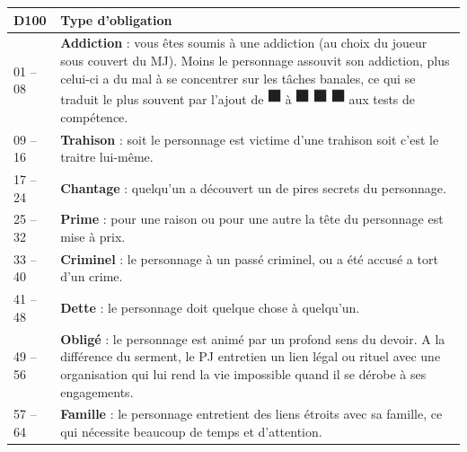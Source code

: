 \documentclass[twoside]{article}
\begin{document}
\renewcommand{\arraystretch}{1.4}
\begin{center}
	\begin{tabular}{|p{4.5cm}|p{12cm}|}
		\hline 
		\cellcolor{DarkRed} {\large \textcolor{PureWhite}{\textbf{D100}}} & \cellcolor{DarkRed} {\large \textcolor{PureWhite}{\textbf{Type d'obligation}}} \\
		\hline 
		01 -- 08 & \textbf{Addiction} : vous êtes soumis à une addiction (au choix du joueur sous couvert du MJ). Moins le personnage assouvit son addiction, plus celui-ci a du mal à se concentrer sur les tâches banales, ce qui se traduit le plus souvent par l'ajout de {\Large \includegraphics[height=\fontcharht\font`\B]{../_img/dice_black}} à {\Large \includegraphics[height=\fontcharht\font`\B]{../_img/dice_black}} {\Large \includegraphics[height=\fontcharht\font`\B]{../_img/dice_black}} {\Large \includegraphics[height=\fontcharht\font`\B]{../_img/dice_black}} aux tests de compétence. \\
		\hline 
		09 -- 16 & \textbf{Trahison} : soit le personnage est victime d'une trahison soit c'est le traitre lui-même. \\
		\hline 
		17 -- 24 & \textbf{Chantage} : quelqu'un a découvert un de pires secrets du personnage. \\
		\hline 
		25 -- 32 & \textbf{Prime} : pour une raison ou pour une autre la tête du personnage est mise à prix. \\
		\hline 
		33 -- 40 & \textbf{Criminel} : le personnage à un passé criminel, ou a été accusé a tort d'un crime. \\
		\hline 
		41 -- 48 & \textbf{Dette} : le personnage doit quelque chose à quelqu'un. \\
		\hline 
		49 -- 56 & \textbf{Obligé} : le personnage est animé par un profond sens du devoir. A la différence du serment, le PJ entretien un lien légal ou rituel avec une organisation qui lui rend la vie impossible quand il se dérobe à ses engagements. \\
		\hline 
		57 -- 64 & \textbf{Famille} : le personnage entretient des liens étroits avec sa famille, ce qui nécessite beaucoup de temps et d'attention. \\

\end{tabular}
\end{center}
\end{document}
